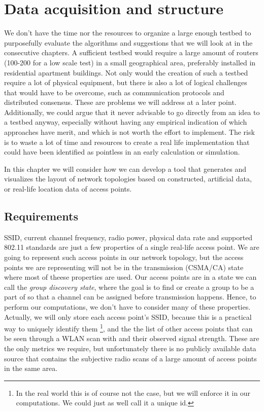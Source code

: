 \chapter{Data acquisition and structure}\label{dataacc}
%
%

We don't have the time nor the resources to organize a large enough testbed to purposefully evaluate the algorithms and suggestions that we will look at in the 
consecutive chapters. A sufficient testbed would require a large amount of routers (100-200 for a low scale test) in a small geographical area, preferably installed in 
residential apartment buildings. Not only would the creation of such a testbed require a lot of physical equipment, but there is also a lot of logical challenges 
that would have to be overcome, such as communication protocols and distributed consensus. These are problems we will address at a later point. Additionally, 
we could argue that it never advisable to go directly from an idea to a testbed anyway, especially without having any empirical indication of which approaches have merit,
and which is not worth the effort to implement. The risk is to waste a lot of time and resources to create a real life implementation that could have been identified as pointless 
in an early calculation or simulation. 

In this chapter we will consider how we can develop a tool that generates and visualizes the layout of network topologies based on constructed, artificial data, or
real-life location data of access points. 

\section{Requirements}
SSID, current channel frequency, radio power, physical data rate and supported 802.11 standards are just a few properties of a single real-life access point.
We are going to represent such access points in our network topology, but the access points we are representing will not be in the transmission (CSMA/CA) state where
most of theese properties are used. Our access points are in a state we can call the \textit{group discovery state}, where the goal is to find or create a group to be a part of
so that a channel can be assigned before transmission happens. Hence, to perform our computations, we don't have to consider many of these properties.
Actually, we will only store each access point's SSID, because this is a practical way to uniquely identify them \footnote{In the real world this is of course not the case,
but we will enforce it in our computations. We could just as well call it a unique id.},  and the the list of other access points that can be seen through a WLAN scan with
and their observed signal strength. These are the only metrics we require, but unfortunately there is no publicly available data source that contains the subjective radio scans
of a large amount of access points in the same area.

